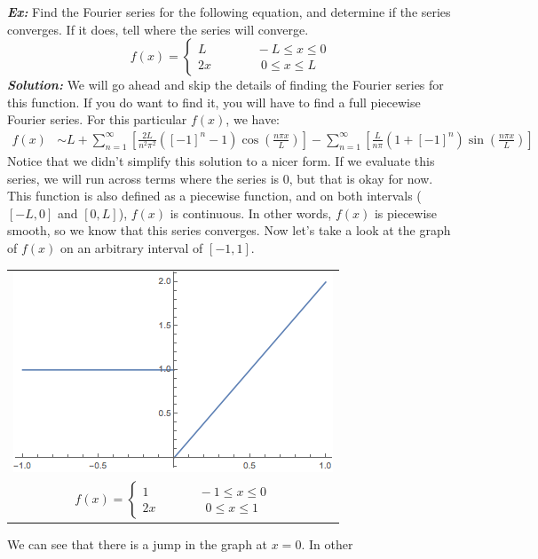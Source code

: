 \documentclass{article}
\begin{document}
\noindent\textbf{\textit{Ex:}} Find the Fourier series for the following
equation, and determine if the series converges. If it does, tell where the
series will converge.
\[ f(x) =
\begin{cases}
L \qquad\qquad -L \leq x \leq 0\\
2x \qquad\qquad 0 \leq x \leq L
\end{cases}
\]
\indent\textbf{\textit{Solution:}} We will go ahead and skip the details of
finding the Fourier series for this function. If you do want to find it, you
will have to find a full piecewise Fourier series. For this particular $f(x)$,
we have:
\begin{align*}
f(x) &\sim L + \sum_{n=1}^{\infty}\left[\frac{2L}{n^{2}\pi^{2}}([-1]^{n}-1)\cos{\left(\frac{n\pi
x}{L}\right)}\right] - \sum_{n=1}^{\infty}\left[\frac{L}{n\pi}(1 + [-1]^{n})\sin{\left(\frac{n\pi
x}{L}\right)}\right]
\end{align*}
\noindent Notice that we didn't simplify this solution to a nicer form.
If we evaluate this series, we will run across terms where the series is 0, but
that is okay for now. This function is also defined as a piecewise function,
and on both intervals ($[-L,0]$ and $[0,L]$), $f(x)$ is continuous. In other
words, $f(x)$ is piecewise smooth, so we know that this series converges. Now
let's take a look at the graph of $f(x)$ on an arbitrary interval of $[-1,1]$.
\begin{center}
\begin{tabular}{c}
\includegraphics[scale=0.6]{pw_graph_01}\\
$
f(x) =
\begin{cases}
1 \qquad\qquad -1 \leq x \leq 0\\
2x \qquad\qquad 0 \leq x \leq 1
\end{cases}
$
\end{tabular}
\end{center}
\noindent We can see that there is a jump in the graph at $x = 0$. In other
\end{document}
